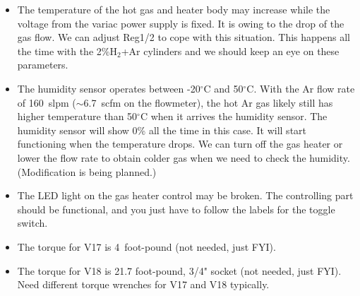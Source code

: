 \documentclass[letterpaper,11pt]{article}
\newcommand{\Hydro}     {H$_2$}
\newcommand{\dC}        {$^\circ$C}
\begin{document}
\begin{itemize}
\item The temperature of the hot gas and heater body may increase while the voltage 
from the variac power supply is fixed.  
It is owing to the drop of the gas flow.  We can adjust Reg1/2 to cope with this situation.
This happens all the time with the 2\%{\Hydro}+Ar cylinders and we should keep an eye on 
these parameters.
\item The humidity sensor operates between -20{\dC} and 50{\dC}.
With the Ar flow rate of 160~slpm ($\sim$6.7~scfm on the flowmeter), the hot Ar gas likely 
still has higher temperature than 50{\dC} when it arrives the humidity sensor.
The humidity sensor will show 0\% all the time in this case.
It will start functioning when the temperature drops.
We can turn off the gas heater or lower the flow rate to obtain colder gas when we need to
check the humidity.
(Modification is being planned.)
\item The LED light on the gas heater control may be broken.  The controlling part 
should be functional, and you just have to follow the labels for the toggle switch.
\item The torque for V17 is 4~foot-pound (not needed, just FYI).
\item The torque for V18 is 21.7 foot-pound, 3/4" socket (not needed, just FYI).  
Need different torque wrenches for V17 and V18 typically.
\end{itemize}
\end{document}
